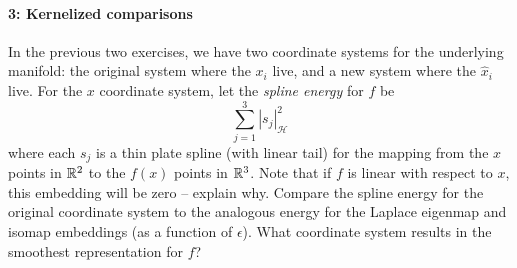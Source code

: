 \documentclass[12pt, leqno]{article} %
\begin{document}
\paragraph*{3: Kernelized comparisons}
In the previous two exercises, we have two coordinate systems for the
underlying manifold: the original system where the $x_i$ live, and a
new system where the $\hat{x}_i$ live.  For the $x$ coordinate system,
let the {\em spline energy} for $f$ be
\[
  \sum_{j=1}^3 |s_j|_{\mathcal{H}}^2
\]
where each $s_j$ is a thin plate spline (with linear tail) for the
mapping from the $x$ points in $\mathbb{R}^2$ to the $f(x)$ points in
$\mathbb{R}^3$.  Note that if $f$ is linear with respect to $x$, this
embedding will be zero -- explain why.  Compare the spline energy for
the original coordinate system to the analogous energy for the Laplace
eigenmap and isomap embeddings (as a function of $\epsilon$).  What
coordinate system results in the smoothest representation for $f$?
\end{document}

